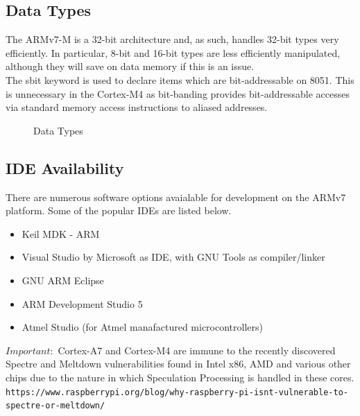 \documentclass{article}
\begin{document}
\subsection{Data Types}\label{subsection:DataTypes}

The ARMv7-M is a 32-bit architecture and, as such, handles 32-bit types very efficiently.
In particular, 8-bit and 16-bit types are less efficiently manipulated, although they will save
on data memory if this is an issue.\\
\newline
The sbit keyword is used to declare items which are bit-addressable on 8051. This is
unnecessary in the Cortex-M4 as bit-banding provides bit-addressable accesses via
standard memory access instructions to aliased addresses.

\begin{figure}[H]
  \caption{Data Types}
  \label{data-types}
\end{figure}

\subsection{IDE Availability}\label{subsection:IDE}

There are numerous software options avaialable for development on the ARMv7 platform. Some of the popular IDEs are listed below.

\begin{itemize}
  \item Keil MDK - ARM
  \item Visual Studio by Microsoft as IDE, with GNU Tools as compiler/linker
  \item GNU ARM Eclipse
  \item ARM Development Studio 5
  \item Atmel Studio (for Atmel manafactured microcontrollers)
\end{itemize}

\(Important:\) Cortex-A7 and Cortex-M4 are immune to the recently discovered Spectre and Meltdown vulnerabilities found in Intel x86, AMD and various other chips due to the nature in which Speculation Processing is handled in these cores.
\\\texttt{https://www.raspberrypi.org/blog/why-raspberry-pi-isnt-vulnerable-to-spectre-or-meltdown/}
\end{document}
